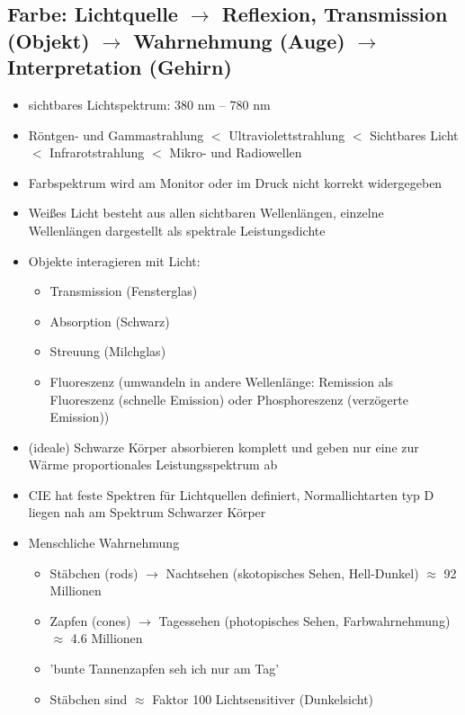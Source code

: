 \documentclass[11pt]{article}
\begin{document}
\subsection{Farbe: Lichtquelle $\rightarrow$ Reflexion, Transmission (Objekt) $\rightarrow$
Wahrnehmung (Auge) $\rightarrow$ Interpretation (Gehirn)}
    \begin{itemize}
        \item sichtbares Lichtspektrum: 380 nm – 780 nm
        \item  Röntgen- und Gammastrahlung $<$ Ultraviolettstrahlung $<$ Sichtbares Licht $<$ Infrarotstrahlung $<$ Mikro- und Radiowellen
        \item Farbspektrum wird am Monitor oder im Druck nicht korrekt widergegeben
        \item Weißes Licht besteht aus allen sichtbaren Wellenlängen, einzelne Wellenlängen dargestellt als spektrale Leistungsdichte
        \item Objekte interagieren mit Licht:
        \begin{itemize}
            \item Transmission (Fensterglas)
            \item Absorption (Schwarz)
            \item Streuung (Milchglas)
            \item Fluoreszenz (umwandeln in andere Wellenlänge: Remission als Fluoreszenz (schnelle Emission) oder Phosphoreszenz (verzögerte Emission))
        \end{itemize}
        \item (ideale) Schwarze Körper absorbieren komplett und geben nur eine zur Wärme proportionales Leistungsspektrum ab
        \item CIE hat feste Spektren für Lichtquellen definiert, Normallichtarten typ D liegen nah am Spektrum Schwarzer Körper
        \item Menschliche Wahrnehmung
        \begin{itemize}
            \item Stäbchen (rods) $\rightarrow$ Nachtsehen (skotopisches Sehen, Hell-Dunkel) $\approx$ 92 Millionen
            \item Zapfen (cones) $\rightarrow$ Tagessehen (photopisches Sehen, Farbwahrnehmung) $\approx$ 4.6 Millionen
            \item 'bunte Tannenzapfen seh ich nur am Tag'
            \item Stäbchen sind $\approx$ Faktor 100 Lichtsensitiver (Dunkelsicht)

\end{itemize}
\end{itemize}
\end{document}
